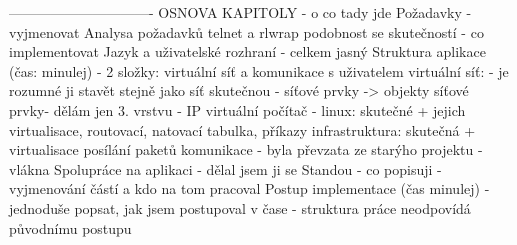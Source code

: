 -------------------------------
OSNOVA KAPITOLY
- o co tady jde
Požadavky - vyjmenovat
Analysa požadavků
  telnet a rlwrap
  podobnost se skutečností - co implementovat
Jazyk a uživatelské rozhraní
  - celkem jasný
Struktura aplikace (čas: minulej)
  - 2 složky: virtuální síť a komunikace s uživatelem
  virtuální síť:
    - je rozumné ji stavět stejně jako síť skutečnou - síťové prvky -> objekty
    síťové prvky- dělám jen 3. vrstvu - IP
      virtuální počítač - linux: skutečné + jejich virtualisace, routovací, natovací tabulka, příkazy
    infrastruktura: skutečná + virtualisace
    posílání paketů
  komunikace
    - byla převzata ze starýho projektu
    - vlákna
Spolupráce na aplikaci
  - dělal jsem ji se Standou
  - co popisuji
  - vyjmenování částí a kdo na tom pracoval
Postup implementace (čas minulej)
  - jednoduše popsat, jak jsem postupoval v čase
  - struktura práce neodpovídá původnímu postupu
